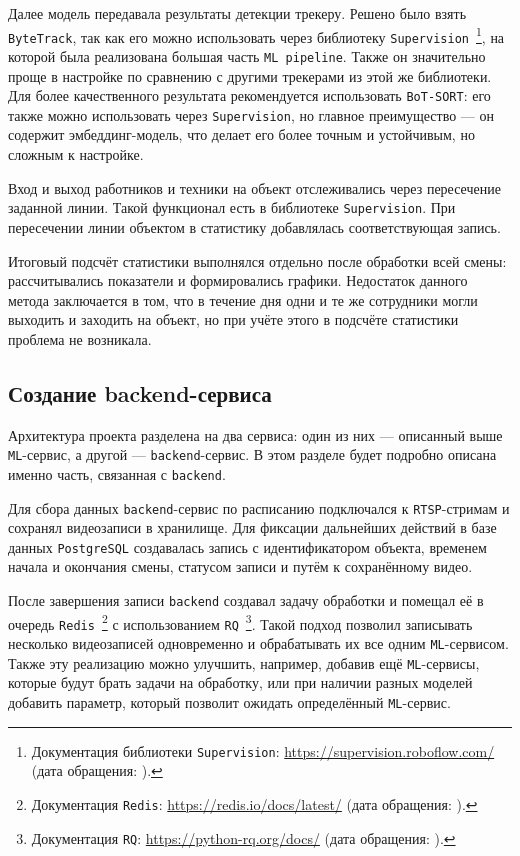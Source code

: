Далее модель передавала результаты детекции трекеру. Решено было взять \texttt{ByteTrack},
так как его можно использовать через библиотеку \texttt{Supervision}~\footnote{Документация библиотеки \texttt{Supervision}: \url{https://supervision.roboflow.com/} (дата обращения: ).},
на которой была реализована большая часть \texttt{ML pipeline}.
Также он значительно проще в настройке по сравнению с другими трекерами из этой же библиотеки.
Для более качественного результата рекомендуется использовать \texttt{BoT-SORT}:
его также можно использовать через \texttt{Supervision}, но главное преимущество --- он содержит эмбеддинг-модель,
что делает его более точным и устойчивым, но сложным к настройке.

Вход и выход работников и техники на объект отслеживались через пересечение заданной линии.
Такой функционал есть в библиотеке \texttt{Supervision}.
При пересечении линии объектом в статистику добавлялась соответствующая запись.

Итоговый подсчёт статистики выполнялся отдельно после обработки всей смены: рассчитывались показатели и формировались графики.
Недостаток данного метода заключается в том, что в течение дня одни и те же сотрудники могли выходить и заходить на объект,
но при учёте этого в подсчёте статистики проблема не возникала.

\subsection{Создание backend-сервиса}
\label{subsec:creating_system_arch}

Архитектура проекта разделена на два сервиса: один из них --- описанный выше \texttt{ML}-сервис, а другой ---
\texttt{backend}-сервис. В этом разделе будет подробно описана именно часть, связанная с \texttt{backend}.



Для сбора данных \texttt{backend}-сервис по расписанию подключался к \texttt{RTSP}-стримам и
сохранял видеозаписи в хранилище. Для фиксации дальнейших действий в базе данных \texttt{PostgreSQL}
создавалась запись с идентификатором объекта, временем начала и окончания смены,
статусом записи и путём к сохранённому видео.

После завершения записи \texttt{backend} создавал задачу обработки
и помещал её в очередь \texttt{Redis}~\footnote{Документация \texttt{Redis}: \url{https://redis.io/docs/latest/} (дата обращения: ).} с использованием \texttt{RQ}~\footnote{Документация \texttt{RQ}: \url{https://python-rq.org/docs/} (дата обращения: ).}. Такой подход позволил
записывать несколько видеозаписей одновременно и обрабатывать их все одним \texttt{ML}-сервисом.
Также эту реализацию можно улучшить, например, добавив ещё \texttt{ML}-сервисы,
которые будут брать задачи на обработку, или при наличии разных моделей добавить параметр,
который позволит ожидать определённый \texttt{ML}-сервис.

